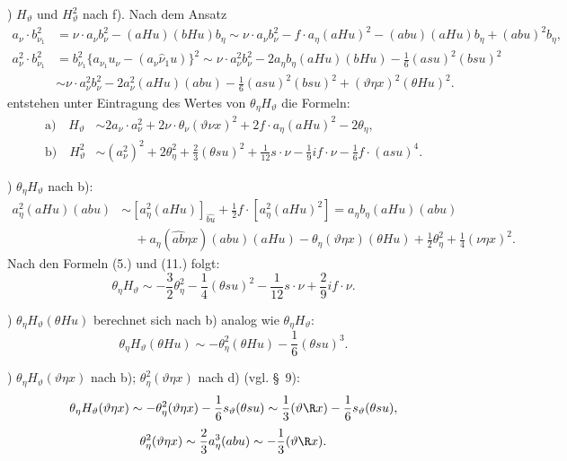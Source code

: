 ) $H_\vartheta$ und $H_\vartheta^2$ nach f). Nach dem Ansatz
\[
\begin{aligned}
a_\nu\cdot b_{\nu_1}^2
&=\nu\cdot a_\nu b_\nu^2-(aHu)(bHu)b_\eta
\sim \nu\cdot a_\nu b_\nu^2-f\cdot a_\eta(aHu)^2-(abu)(aHu)b_\eta+(abu)^2b_\eta,\\
a_\nu^2\cdot b_{\nu_1}^2
&=b_{\nu_1}^2\{a_{\nu_1}u_\nu-(a_\nu\widehat{\nu}_1u)\}^2
\sim \nu\cdot a_\nu^2b_\nu^2-2a_\eta b_\eta(aHu)(bHu)-\frac16(asu)^2(bsu)^2\\
&\sim \nu\cdot a_\nu^2b_\nu^2-2a_\nu^2(aHu)(abu)-\frac16(asu)^2(bsu)^2+(\vartheta\eta x)^2(\theta Hu)^2.
\end{aligned}
\]
entstehen unter Eintragung des Wertes von $\theta_\eta H_\vartheta$ die Formeln:
\[
\tag{12}
\begin{aligned}
\text{a)}\quad H_\vartheta&\sim 2a_\nu\cdot a_\nu^2+2\nu\cdot\theta_\nu(\vartheta\nu x)^2+2f\cdot a_\eta(aHu)^2-2\theta_\eta,\\
\text{b)}\quad H_\vartheta^2&\sim (a_\nu^2)^2+2\theta_\eta^2+\frac23(\theta su)^2+\frac1{12}s\cdot\nu-\frac19 i f\cdot\nu-\frac16f\cdot(asu)^4.
\end{aligned}
\]

) $\theta_\eta H_\vartheta$ nach b):
\[
\begin{aligned}
a_\eta^2(aHu)(abu)
&\sim [a_\eta^2(aHu)]_{\widehat{bu}}+\frac12 f\cdot[a_\eta^2(aHu)^2]
=a_\eta b_\eta(aHu)(abu)\\
&\quad+a_\eta(\widehat{ab}\eta x)(abu)(aHu)-\theta_\eta(\vartheta\eta x)(\theta Hu)+\frac12\theta_\eta^2+\frac14(\nu\eta x)^2.
\end{aligned}
\]
Nach den Formeln (5.) und (11.) folgt:
\[
\theta_\eta H_\vartheta\sim-\frac32\theta_\eta^2-\frac14(\theta su)^2-\frac1{12}s\cdot\nu+\frac29 i f\cdot\nu.
\]

) $\theta_\eta H_\vartheta(\theta Hu)$ berechnet sich nach b) analog wie $\theta_\eta H_\vartheta$:
\[
\theta_\eta H_\vartheta(\theta Hu)\sim-\theta_\eta^2(\theta Hu)-\frac16(\theta su)^3.
\]

) $\theta_\eta H_\vartheta(\vartheta\eta x)$ nach b); $\theta_\eta^2(\vartheta\eta x)$ nach d) (vgl. \S\ 9):
\[
\theta_\eta H_\vartheta(\vartheta\eta x)\sim-\theta_\eta^2(\vartheta\eta x)-\frac16s_\vartheta(\theta su)
\sim\frac13(\vartheta\R x)-\frac16s_\vartheta(\theta su),
\]
\[
\theta_\eta^2(\vartheta\eta x)\sim\frac23a_\eta^3(abu)\sim-\frac13(\vartheta\R x).
\]



